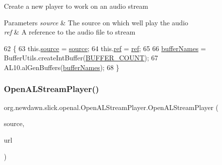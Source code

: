 Create a new player to work on an audio stream


\begin{DoxyParams}{Parameters}
{\em source} & The source on which we\textquotesingle{}ll play the audio \\
\hline
{\em ref} & A reference to the audio file to stream \\
\hline
\end{DoxyParams}

\begin{DoxyCode}
62                                                       \{
63         this.\mbox{\hyperlink{classorg_1_1newdawn_1_1slick_1_1openal_1_1_open_a_l_stream_player_abe9f7d1ac52a705aa359cf3eb1c69464}{source}} = \mbox{\hyperlink{classorg_1_1newdawn_1_1slick_1_1openal_1_1_open_a_l_stream_player_abe9f7d1ac52a705aa359cf3eb1c69464}{source}};
64         this.\mbox{\hyperlink{classorg_1_1newdawn_1_1slick_1_1openal_1_1_open_a_l_stream_player_ab01c1f73849aaeae84d969cbd05d4683}{ref}} = \mbox{\hyperlink{classorg_1_1newdawn_1_1slick_1_1openal_1_1_open_a_l_stream_player_ab01c1f73849aaeae84d969cbd05d4683}{ref}};
65         
66         \mbox{\hyperlink{classorg_1_1newdawn_1_1slick_1_1openal_1_1_open_a_l_stream_player_a97e8e27c6864fcc5abe85728a3e0a60b}{bufferNames}} = BufferUtils.createIntBuffer(\mbox{\hyperlink{classorg_1_1newdawn_1_1slick_1_1openal_1_1_open_a_l_stream_player_a6fabd8395e8301d9b2ea613f8b7d739c}{BUFFER\_COUNT}});
67         AL10.alGenBuffers(\mbox{\hyperlink{classorg_1_1newdawn_1_1slick_1_1openal_1_1_open_a_l_stream_player_a97e8e27c6864fcc5abe85728a3e0a60b}{bufferNames}});
68     \}
\end{DoxyCode}
\mbox{\label{classorg_1_1newdawn_1_1slick_1_1openal_1_1_open_a_l_stream_player_a8ad9837700d6ade18caa42643c96c916}} 
\subsubsection{\texorpdfstring{Open\+A\+L\+Stream\+Player()}{OpenALStreamPlayer()}\hspace{0.1cm}{\footnotesize\ttfamily [2/2]}}
{\footnotesize\ttfamily org.\+newdawn.\+slick.\+openal.\+Open\+A\+L\+Stream\+Player.\+Open\+A\+L\+Stream\+Player (\begin{DoxyParamCaption}\item[{int}]{source,  }\item[{U\+RL}]{url }\end{DoxyParamCaption})\hspace{0.3cm}{\ttfamily [inline]}}

